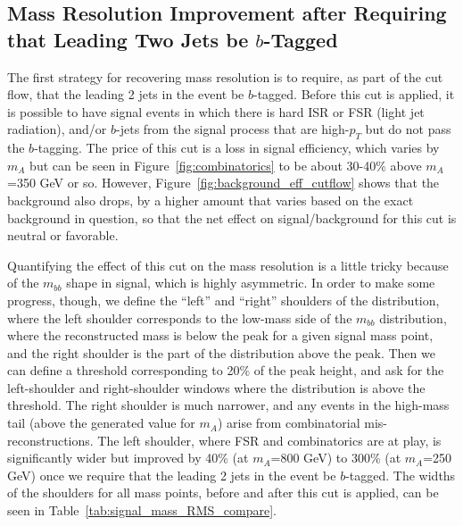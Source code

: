 \subsection{Mass Resolution Improvement after Requiring that Leading Two Jets be $b$-Tagged}
The first strategy for recovering mass resolution is to require, as part of the cut flow,
that the leading 2 jets in the event be $b$-tagged.  Before this cut is applied, it is
possible to have signal events in which there is hard ISR or FSR (light jet radiation),
and/or $b$-jets from the signal process that are high-$p_T$ but do not pass the $b$-tagging.
The price of this cut is a loss in signal efficiency, which varies by $m_A$ but can be 
seen in Figure~\ref{fig:combinatorics} to be about 30-40\% above $m_A$=350 GeV or so.
However, Figure~\ref{fig:background_eff_cutflow} shows that the background also drops, 
by a higher amount that varies based on the exact background in question, so that the net 
effect on signal/background for this cut is neutral or favorable.
 

Quantifying the effect of this cut on the mass resolution is a little tricky because of the
$m_{bb}$ shape in signal, which is highly asymmetric.  In order to make some progress, though,
we define the ``left'' and ``right'' shoulders of the distribution, where the left shoulder
corresponds to the low-mass side of the $m_{bb}$ distribution, where the reconstructed mass 
is below the peak for a given signal mass point,
and the right shoulder is the part of the distribution above the peak.  Then we can define
a threshold corresponding to 20\% of the peak height, and ask for the left-shoulder and right-shoulder
windows where the distribution is above the threshold.  The right shoulder is much narrower,
and any events in the high-mass tail (above the generated value for $m_A$) arise from 
combinatorial mis-reconstructions.  The left shoulder, where FSR and combinatorics are
at play, is significantly wider but improved by 40\% (at $m_A$=800 GeV) to 300\% (at $m_A$=250 GeV)
once we require that the leading 2 jets in the event be $b$-tagged.  The widths of the shoulders
for all mass points, before and after this cut is applied, can be seen in Table~\ref{tab:signal_mass_RMS_compare}.



